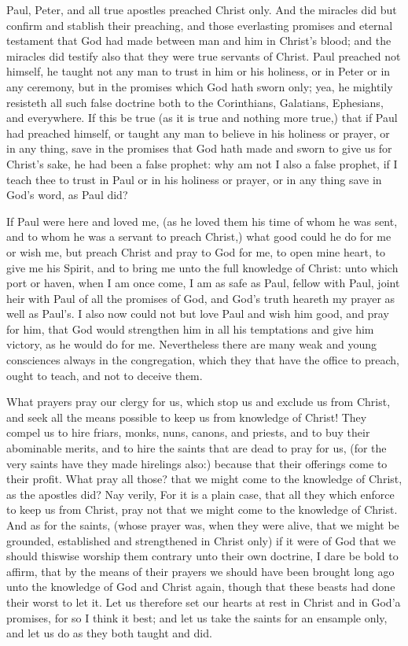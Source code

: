 Paul, Peter, and all true apostles preached Christ only.
And the miracles did but confirm and stablish their
preaching, and those everlasting promises and eternal testament
that God had made between man and him in
Christ's blood; and the miracles did testify also that they 
were true servants of Christ. Paul preached not himself,
he taught not any man to trust in him or his holiness, or in
Peter or in any ceremony, but in the promises which God 
hath sworn only; yea, he mightily resisteth all such false
doctrine both to the Corinthians, Galatians, Ephesians,
and everywhere. If this be true (as it is true and nothing 
more true,) that if Paul had preached himself, or taught 
any man to believe in his holiness or prayer, or in any thing,
save in the promises that God hath made and sworn to
give us for Christ's sake, he had been a false prophet:
why am not I also a false prophet, if I teach thee to trust 
in Paul or in his holiness or prayer, or in any thing save 
in God's word, as Paul did? 

If Paul were here and loved me, (as he loved them 
his time of whom he was sent, and to whom he was a servant 
to preach Christ,) what good could he do for me or wish 
me, but preach Christ and pray to God for me, to open 
mine heart, to give me his Spirit, and to bring me unto the 
full knowledge of Christ: unto which port or haven, when 
I am once come, I am as safe as Paul, fellow with Paul, 
joint heir with Paul of all the promises of God, and God's 
truth heareth my prayer as well as Paul's. I also now could 
not but love Paul and wish him good, and pray for him, 
that God would strengthen him in all his temptations and 
give him victory, as he would do for me. Nevertheless 
there are many weak and young consciences always in 
the congregation, which they that have the office to preach, 
ought to teach, and not to deceive them. 

What prayers pray our clergy for us, which stop us and 
exclude us from Christ, and seek all the means possible to 
keep us from knowledge of Christ! They compel us to 
hire friars, monks, nuns, canons, and priests, and to 
buy their abominable merits, and to hire the saints that 
are dead to pray for us, (for the very saints have they made 
hirelings also:) because that their offerings come to their 
profit. What pray all those? that we might come to the 
knowledge of Christ, as the apostles did? Nay verily, For 
it is a plain case, that all they which enforce to keep us 
from Christ, pray not that we might come to the knowledge
of Christ. And as for the saints, (whose prayer was, 
when they were alive, that we might be grounded, established
and strengthened in Christ only) if it were of God 
that we should thiswise worship them contrary unto their 
own doctrine, I dare be bold to affirm, that by the means 
of their prayers we should have been brought long ago 
unto the knowledge of God and Christ again, though that 
these beasts had done their worst to let it. Let us therefore
set our hearts at rest in Christ and in God'a promises, 
for so I think it best; and let us take the saints for an ensample
only, and let us do as they both taught and did. 


